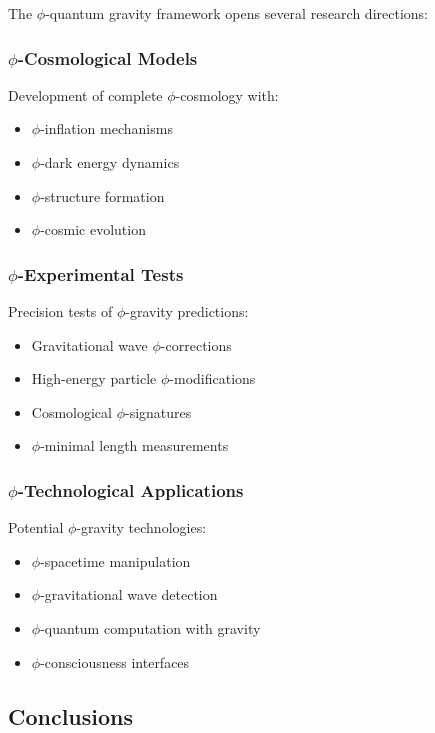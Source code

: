 The $\phi$-quantum gravity framework opens several research directions:

\subsubsection{$\phi$-Cosmological Models}

Development of complete $\phi$-cosmology with:
\begin{itemize}
\item $\phi$-inflation mechanisms
\item $\phi$-dark energy dynamics  
\item $\phi$-structure formation
\item $\phi$-cosmic evolution
\end{itemize}

\subsubsection{$\phi$-Experimental Tests}

Precision tests of $\phi$-gravity predictions:
\begin{itemize}
\item Gravitational wave $\phi$-corrections
\item High-energy particle $\phi$-modifications
\item Cosmological $\phi$-signatures
\item $\phi$-minimal length measurements
\end{itemize}

\subsubsection{$\phi$-Technological Applications}

Potential $\phi$-gravity technologies:
\begin{itemize}
\item $\phi$-spacetime manipulation
\item $\phi$-gravitational wave detection
\item $\phi$-quantum computation with gravity
\item $\phi$-consciousness interfaces
\end{itemize}

\subsection{Conclusions}

